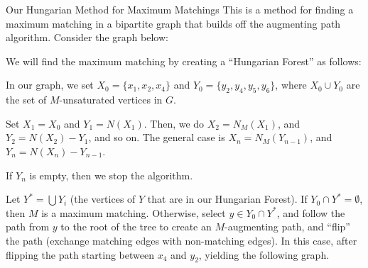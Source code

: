 \documentclass[10pt]{extarticle}
\begin{document}
  \begin{problem}{Our Hungarian Method for Maximum Matchings}
    This is a method for finding a maximum matching in a bipartite graph that builds off the augmenting path algorithm. Consider the graph below:
    \begin{center}
    \end{center}
    We will find the maximum matching by creating a ``Hungarian Forest'' as follows:
    \begin{description}[font=\normalfont\scshape]
      \item[Initialization] In our graph, we set $X_0 = \{x_1,x_2,x_4\}$ and $Y_0 = \{y_2,y_4,y_5,y_6\}$, where $X_0 \cup Y_0$ are the set of $M$-unsaturated vertices in $G$.
      \item[Iteration] Set $X_1 = X_0$ and $Y_1 = N(X_1)$. Then, we do $X_2 = N_M(X_1)$, and $Y_2 = N(X_2) - Y_1$, and so on. The general case is $X_n = N_M(Y_{n-1})$, and $Y_n = N(X_n) - Y_{n-1}$.
      \item[End condition] If $Y_n$ is empty, then we stop the algorithm.
    \end{description}
    Let $Y^* = \bigcup Y_i$ (the vertices of $Y$ that are in our Hungarian Forest). If $Y_0 \cap Y^* = \emptyset$, then $M$ is a maximum matching. Otherwise, select $y\in Y_0 \cap Y^*$, and follow the path from $y$ to the root of the tree to create an $M$-augmenting path, and ``flip'' the path (exchange matching edges with non-matching edges). In this case, after flipping the path starting between $x_4$ and $y_2$, yielding the following graph.
    \begin{center}

\end{center}
\end{problem}
\end{document}
